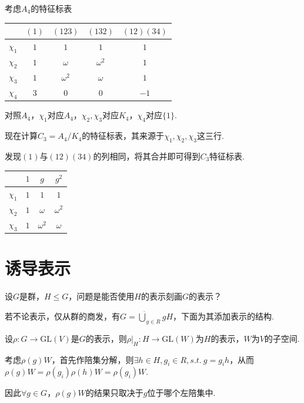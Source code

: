 \begin{instance}
    考虑$A_4$的特征标表
    \begin{center}
        \begin{tabular}{c|cccc}
                     & $(1)$ & $(123)$    & $(132)$    & $(12)(34)$ \\ \hline
            $\chi_1$ & $1$   & $1$        & $1$        & $1$        \\
            $\chi_2$ & $1$   & $\omega$   & $\omega^2$ & $1$        \\
            $\chi_3$ & $1$   & $\omega^2$ & $\omega$   & $1$        \\
            $\chi_4$ & $3$   & $0$        & $0$        & $-1$
        \end{tabular}
    \end{center}
    对照$A_4$，$\chi_1$对应$A_4$，$\chi_2, \chi_3$对应$K_4$，$\chi_4$对应$\{1\}$.\par
    现在计算$C_3 = A_4 / K_4$的特征标表，其来源于$\chi_1,\chi_2,\chi_3$这三行.\par
    发现$(1)$与$(12)(34)$的列相同，将其合并即可得到$C_3$特征标表.
    \begin{center}
        \begin{tabular}{c|ccc}
                     & $1$ & $g$        & $g^2$      \\ \hline
            $\chi_1$ & $1$ & $1$        & $1$        \\
            $\chi_2$ & $1$ & $\omega$   & $\omega^2$ \\
            $\chi_3$ & $1$ & $\omega^2$ & $\omega$
        \end{tabular}
    \end{center}
\end{instance}

\section{诱导表示}

设$G$是群，$H \leqslant G$，问题是能否使用$H$的表示刻画$G$的表示？\par
若不论表示，仅从群的商发，有$G = \dot{\bigcup}_{g \in R} gH$，下面为其添加表示的结构.\par
设$\rho: G \to \mathrm{GL}(V)$是$G$的表示，则$\rho|_H: H \to \mathrm{GL}(W)$为$H$的表示，$W$为$V$的子空间.\par
考虑$\rho(g)W$，首先作陪集分解，则$\exists h \in H, g_i \in R, s.t.\ g = g_i h$，从而$\rho(g)W = \rho(g_i)\rho(h)W = \rho(g_i)W$.\par
因此$\forall g \in G$，$\rho(g)W$的结果只取决于$g$位于哪个左陪集中.\par

